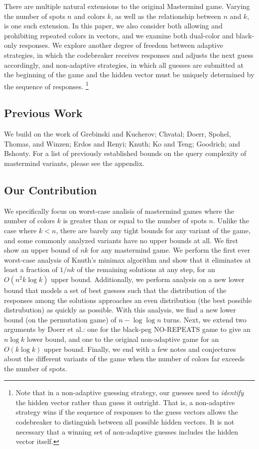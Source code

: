 \documentclass[12pt, a4paper]{article}
\begin{document}
There are multiple natural extensions to the original Mastermind game. Varying the
number of spots $n$ and colors $k$, as well as the relationship between $n$ and $k$,
is one such extension. In this paper, we also consider both allowing and prohibiting
repeated colors in vectors, and we examine both dual-color and black-only responses.
We explore another degree of freedom between adaptive strategies, in which the
codebreaker receives responses and adjusts the next guess accordingly, and non-adaptive
strategies, in which all guesses are submitted at the beginning of the
game and the hidden vector must be uniquely determined by the sequence of responses.
\footnote{Note that in a non-adaptive guessing strategy, our guesses need to
\textit{identify} the hidden vector rather than guess it outright. That is, a
non-adaptive strategy wins if the sequence of responses to the guess vectors allows
the codebreaker to distinguish between all possible hidden vectors. It is not
necessary that a winning set of non-adaptive guesses includes the hidden vector
itself.}

\subsection{Previous Work}
We build on the work of Grebinski and Kucherov; Chvatal; Doerr, Spohel, Thomas, and
Winzen; Erdos and Renyi; Knuth; Ko and Teng; Goodrich; and Bshouty. For a list of
previously established bounds on the query complexity of mastermind variants, please
see the appendix.

\subsection{Our Contribution}
We specifically focus on worst-case analisis of mastermind games where the number of colors
$k$ is greater than or equal to the number of spots $n$. Unlike the case where $k < n$,
there are barely any tight bounds for any variant of the game, and some commonly analyzed
variants have no upper bounds at all. We first show an upper bound of $nk$ for any mastermind
game. We perform the first ever worst-case analysis of Knuth's minimax algorithm and show
that it eliminates at least a fraction of $1/nk$ of the remaining solutions at any step, for an 
$O(n^2k \log k)$ upper bound. Additionally, we perform analysis on a new lower bound that
models a set of best guesses such that the distribution of the responses among the solutions
approaches an even distribution (the best possible distrubution) as quickly as possible. With this
analysis, we find a new lower bound (on the permutation game) of $n- \log \log n$ turns.
Next, we extend two arguments by Doerr et al.: one for the black-peg NO-REPEATS game to 
give an $n \log k$ lower bound, and one to the original non-adaptive game for an $O(k \log k)$ 
upper bound. Finally, we end with a few notes and conjectures about the different variants of
the game when the number of colors far exceeds the number of spots.
\end{document}
